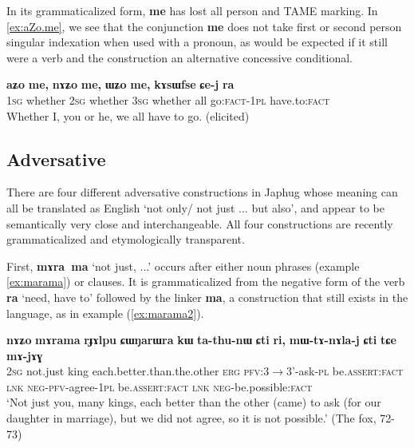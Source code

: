 \documentclass[oldfontcommands,oneside,a4paper,11pt]{article}
\newcommand{\ipa}[1]{\mbox{\phon\textbf{#1}}} %
\begin{document}
 In its grammaticalized form, \ipa{me} has lost all person and TAME marking.  In \ref{ex:aZo.me}, we see that the conjunction \ipa{me} does not take first or second person singular indexation when used with a pronoun, as would be expected if it still were a verb and the construction an alternative  concessive conditional.
 
 \begin{exe}
\ex \label{ex:aZo.me}
\gll 
 \ipa{aʑo} 	\ipa{me,} 	\ipa{nɤʑo} 	\ipa{me,} 	\ipa{ɯʑo} 	\ipa{me,} 	\ipa{kɤsɯfse} 	\ipa{ɕe-j} 	\ipa{ra} \\
\textsc{1sg} whether \textsc{2sg} whether \textsc{3sg} whether all go:\textsc{fact}-\textsc{1pl} have.to:\textsc{fact} \\
\glt Whether I, you or he, we all have to go. (elicited)
\end{exe}


\subsection{Adversative}
There are four different  adversative constructions in Japhug whose meaning can all be translated as English  `not only/ not just ... but also', and appear to be semantically very close and interchangeable. All four constructions are recently grammaticalized and etymologically transparent.

First, \ipa{mɤra ma} `not just, ...'  occurs after either noun phrases (example  \ref{ex:marama}) or clauses. It is grammaticalized from the negative form of the verb \ipa{ra} `need, have to' followed by the linker \ipa{ma}, a construction that still exists in the language, as in example (\ref{ex:marama2}).

\begin{exe}
\ex \label{ex:marama}
\gll \ipa{nɤʑo} 	\ipa{mɤrama} 	\ipa{rɟɤlpu} 	\ipa{ɕɯŋarɯra} 	\ipa{kɯ} 	\ipa{ta-thu-nɯ} 	\ipa{ɕti} 	\ipa{ri,} 	\ipa{mɯ-tɤ-nɤla-j} 	\ipa{ɕti} 	\ipa{tɕe} 	\ipa{mɤ-jɤɣ}  \\
\textsc{2sg} not.just king each.better.than.the.other \textsc{erg} \textsc{pfv}:3$\rightarrow$3'-ask-\textsc{pl} be.\textsc{assert:fact} \textsc{lnk} \textsc{neg-pfv}-agree-\textsc{1pl} be.\textsc{assert:fact} \textsc{lnk} \textsc{neg}-be.possible:\textsc{fact} \\
\glt `Not just you, many kings, each better than the other (came) to ask (for our daughter in marriage), but we did not agree, so it is not possible.' (The fox, 72-73)
\end{exe}
\end{document}
